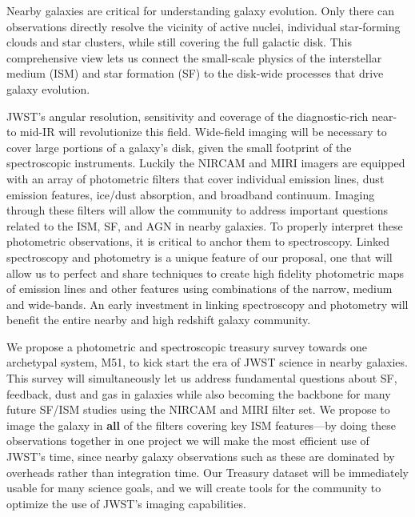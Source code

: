 \documentclass[12pt]{article}
\begin{document}
%
%
\justification          %
Nearby galaxies are critical for understanding galaxy evolution. Only there can observations directly resolve the vicinity of active nuclei, individual star-forming clouds and star clusters, while still covering the full galactic disk. This comprehensive view lets us connect the small-scale physics of the interstellar medium (ISM) and star formation (SF) to the disk-wide processes that drive galaxy evolution. 

JWST's angular resolution, sensitivity and coverage of the diagnostic-rich near- to mid-IR will revolutionize this field.  Wide-field imaging will be necessary to cover large portions of a galaxy’s disk, given the small footprint of the spectroscopic instruments.  Luckily the NIRCAM and MIRI imagers are equipped with an array of photometric filters that cover individual emission lines, dust emission features, ice/dust absorption, and broadband continuum.  Imaging through these filters will allow the community to address important questions related to the ISM, SF, and AGN in nearby galaxies.  To properly interpret these photometric observations, it is critical to anchor them to spectroscopy.  Linked spectroscopy and photometry is a unique feature of our proposal, one that will allow us to perfect  and share techniques to create high fidelity photometric maps of emission lines and other features using combinations of the narrow, medium and wide-bands.  An early investment in linking spectroscopy and photometry will benefit the entire nearby and high redshift galaxy community.

We propose a photometric and spectroscopic treasury survey towards one archetypal system, M51, to kick start the era of JWST science in nearby galaxies.  This survey will simultaneously let us address fundamental questions about SF, feedback, dust and gas in galaxies while also becoming the backbone for many future SF/ISM studies using the NIRCAM and MIRI filter set. We propose to image the galaxy in {\bf all} of the filters covering key ISM features---by doing these observations together in one project we will make the most efficient use of JWST's time, since nearby galaxy observations such as these are dominated by overheads rather than integration time.  Our Treasury dataset will be immediately usable for many science goals, and we will create tools for the community to optimize the use of JWST's imaging capabilities.    
\end{document}
